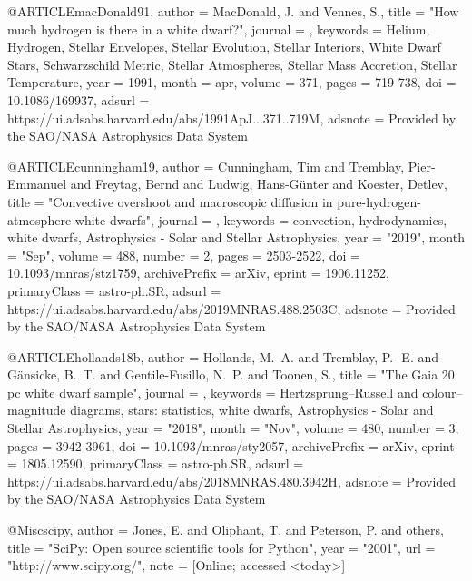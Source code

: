 \documentclass[a4paper,fleqn,usenatbib]{mnras}
\begin{document}
{{{{{{{{{{{@ARTICLE{macDonald91,
   author = {{MacDonald}, J. and {Vennes}, S.},
    title = "{How much hydrogen is there in a white dwarf?}",
  journal = {\apj},
 keywords = {Helium, Hydrogen, Stellar Envelopes, Stellar Evolution, Stellar Interiors, White Dwarf Stars, Schwarzschild Metric, Stellar Atmospheres, Stellar Mass Accretion, Stellar Temperature},
     year = 1991,
    month = apr,
   volume = 371,
    pages = {719-738},
      doi = {10.1086/169937},
   adsurl = {https://ui.adsabs.harvard.edu/abs/1991ApJ...371..719M},
  adsnote = {Provided by the SAO/NASA Astrophysics Data System}
}

@ARTICLE{cunningham19,
       author = {{Cunningham}, Tim and {Tremblay}, Pier-Emmanuel and {Freytag}, Bernd and
         {Ludwig}, Hans-G{\"u}nter and {Koester}, Detlev},
        title = "{Convective overshoot and macroscopic diffusion in pure-hydrogen-atmosphere white dwarfs}",
      journal = {\mnras},
     keywords = {convection, hydrodynamics, white dwarfs, Astrophysics - Solar and Stellar Astrophysics},
         year = "2019",
        month = "Sep",
       volume = {488},
       number = {2},
        pages = {2503-2522},
          doi = {10.1093/mnras/stz1759},
archivePrefix = {arXiv},
       eprint = {1906.11252},
 primaryClass = {astro-ph.SR},
       adsurl = {https://ui.adsabs.harvard.edu/abs/2019MNRAS.488.2503C},
      adsnote = {Provided by the SAO/NASA Astrophysics Data System}
}

@ARTICLE{hollands18b,
       author = {{Hollands}, M.~A. and {Tremblay}, P. -E. and {G{\"a}nsicke}, B.~T. and
         {Gentile-Fusillo}, N.~P. and {Toonen}, S.},
        title = "{The Gaia 20 pc white dwarf sample}",
      journal = {\mnras},
     keywords = {Hertzsprung--Russell and colour--magnitude diagrams, stars: statistics, white dwarfs, Astrophysics - Solar and Stellar Astrophysics},
         year = "2018",
        month = "Nov",
       volume = {480},
       number = {3},
        pages = {3942-3961},
          doi = {10.1093/mnras/sty2057},
archivePrefix = {arXiv},
       eprint = {1805.12590},
 primaryClass = {astro-ph.SR},
       adsurl = {https://ui.adsabs.harvard.edu/abs/2018MNRAS.480.3942H},
      adsnote = {Provided by the SAO/NASA Astrophysics Data System}
}

@Misc{scipy,
  author =    {{Jones}, E. and {Oliphant}, T. and {Peterson}, P. and {others}},
  title =     "{{SciPy}: Open source scientific tools for {Python}}",
  year =      "2001",
  url = "http://www.scipy.org/",
  note = {[Online; accessed <today>]}
}

}}}}}}}}}}}
\end{document}
